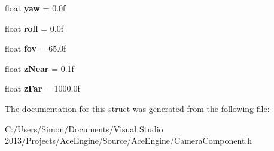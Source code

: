 \begin{DoxyCompactItemize}
\item 
\hypertarget{struct_camera_component_a5c4e3536d3e7f15313f1a2b83a2095d9}{}float {\bfseries yaw} = 0.\+0f\label{struct_camera_component_a5c4e3536d3e7f15313f1a2b83a2095d9}

\item 
\hypertarget{struct_camera_component_aaa1e1e7bf6661a77d556306367bbcc41}{}float {\bfseries roll} = 0.\+0f\label{struct_camera_component_aaa1e1e7bf6661a77d556306367bbcc41}

\item 
\hypertarget{struct_camera_component_ad191cef2c4cd0c9fff185bf41fbebb88}{}float {\bfseries fov} = 65.\+0f\label{struct_camera_component_ad191cef2c4cd0c9fff185bf41fbebb88}

\item 
\hypertarget{struct_camera_component_a44ff1ccd1b703e9ead065969be8fb044}{}float {\bfseries z\+Near} = 0.\+1f\label{struct_camera_component_a44ff1ccd1b703e9ead065969be8fb044}

\item 
\hypertarget{struct_camera_component_aea7d06f025c69f1db065e04bd477f19c}{}float {\bfseries z\+Far} = 1000.\+0f\label{struct_camera_component_aea7d06f025c69f1db065e04bd477f19c}

\end{DoxyCompactItemize}


The documentation for this struct was generated from the following file\+:\begin{DoxyCompactItemize}
\item 
C\+:/\+Users/\+Simon/\+Documents/\+Visual Studio 2013/\+Projects/\+Ace\+Engine/\+Source/\+Ace\+Engine/Camera\+Component.\+h\end{DoxyCompactItemize}
